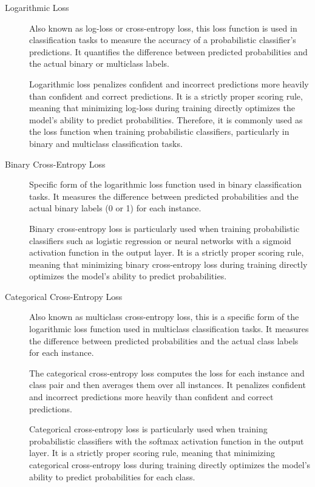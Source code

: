 \documentclass[a4paper]{article}
\begin{document}
\begin{description}
\item[Logarithmic Loss]
Also known as log-loss or cross-entropy loss, this loss function is used in classification tasks to measure the accuracy of a probabilistic classifier's predictions. It quantifies the difference between predicted probabilities and the actual binary or multiclass labels.

Logarithmic loss penalizes confident and incorrect predictions more heavily than confident and correct predictions. It is a strictly proper scoring rule, meaning that minimizing log-loss during training directly optimizes the model's ability to predict probabilities. Therefore, it is commonly used as the loss function when training probabilistic classifiers, particularly in binary and multiclass classification tasks.

\item[Binary Cross-Entropy Loss]
Specific form of the logarithmic loss function used in binary classification tasks. It measures the difference between predicted probabilities and the actual binary labels (0 or 1) for each instance.

Binary cross-entropy loss is particularly used when training probabilistic classifiers such as logistic regression or neural networks with a sigmoid activation function in the output layer. It is a strictly proper scoring rule, meaning that minimizing binary cross-entropy loss during training directly optimizes the model's ability to predict probabilities.

\item[Categorical Cross-Entropy Loss]
Also known as multiclass cross-entropy loss, this is a specific form of the logarithmic loss function used in multiclass classification tasks. It measures the difference between predicted probabilities and the actual class labels for each instance.

The categorical cross-entropy loss computes the loss for each instance and class pair and then averages them over all instances. It penalizes confident and incorrect predictions more heavily than confident and correct predictions. 

Categorical cross-entropy loss is particularly used when training probabilistic classifiers with the softmax activation function in the output layer. It is a strictly proper scoring rule, meaning that minimizing categorical cross-entropy loss during training directly optimizes the model's ability to predict probabilities for each class.


\end{description}
\end{document}
